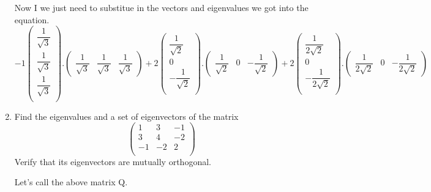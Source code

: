 \documentclass[fleqn]{article}
\begin{document}
\begin{enumerate}
      \textcolor{hwColor}{
        Now I we just need to substitue in the vectors and eigenvalues we got into the equation.
        $
        -1\begin{pmatrix}
          \dfrac{1}{\sqrt{3}} \\
          \dfrac{1}{\sqrt{3}} \\
          \dfrac{1}{\sqrt{3}} \\
        \end{pmatrix}.\begin{pmatrix}
          \dfrac{1}{\sqrt{3}} & \dfrac{1}{\sqrt{3}} & \dfrac{1}{\sqrt{3}}
        \end{pmatrix}
         +
        2\begin{pmatrix}
          \dfrac{1}{\sqrt{2}} \\
          0 \\
          -\dfrac{1}{\sqrt{2}} \\
        \end{pmatrix}.\begin{pmatrix}
          \dfrac{1}{\sqrt{2}} & 0 & -\dfrac{1}{\sqrt{2}}
        \end{pmatrix}
        +
        2\begin{pmatrix}
          \dfrac{1}{2\sqrt{2}} \\
          0 \\
          -\dfrac{1}{2\sqrt{2}} \\
        \end{pmatrix}.\begin{pmatrix}
          \dfrac{1}{2\sqrt{2}} & 0 & -\dfrac{1}{2\sqrt{2}} 
        \end{pmatrix}
        $
      }
      

    \item Find the eigenvalues and a set of eigenvectors of the matrix
      $$ 
      \begin{pmatrix}
        1 & 3 & -1 \\
        3 & 4 & -2 \\
        -1 & -2 & 2 \\
      \end{pmatrix}
      $$
      Verify that its eigenvectors are mutually orthogonal.

      \textcolor{hwColor}{
        Let's call the above matrix Q.
      }


\end{enumerate}
\end{document}
